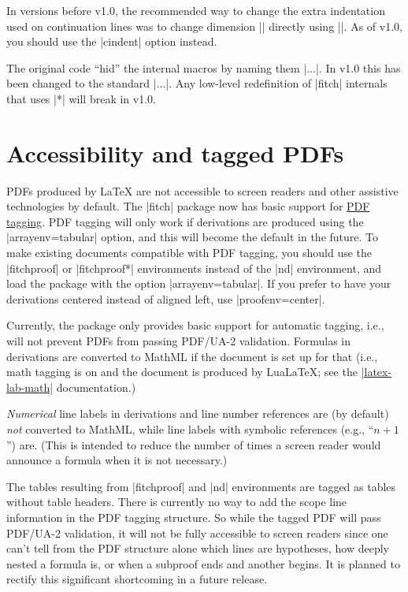 \documentclass{ltxdoc}
\newcommand\NewIn[1]{\leavevmode
  \marginpar{\hfill\fbox{\fbox{New in #1}}\hspace*{1em}}\ignorespaces}
\begin{document}
\NewIn{1.0}\DescribeMacro{\ndindent} In versions before v1.0, the recommended way
to change the extra indentation used on continuation lines was to
change dimension |\ndindent| directly using |\setlength|. As of v1.0,
you should use the |cindent| option instead.

The original code ``hid'' the internal macros by naming
them |\nd*...|. In v1.0 this has been changed to the standard
|\nd@...|. Any low-level redefinition of |fitch| internals that uses
|*| will break in v1.0.

\section{Accessibility and tagged PDFs}\label{sec-tagging}

PDFs produced by {\LaTeX} are not accessible to screen readers and
other assistive technologies by default. The |fitch| package now has
basic support for \href{https://latex3.github.io/tagging-project/}{PDF
tagging}. PDF tagging will only work if derivations are produced using
the |arrayenv=tabular| option, and this will become the default in the
future. To make existing documents compatible with PDF tagging, you
should use the |fitchproof| or |fitchproof*| environments instead of
the |nd| environment, and load the package with the option
|arrayenv=tabular|. If you prefer to have your derivations centered
instead of aligned left, use |proofenv=center|.

Currently, the package only provides basic support for automatic
tagging, i.e., will not prevent PDFs from passing PDF/UA-2 validation.
Formulas in derivations are converted to MathML if the document is set
up for that (i.e., math tagging is on and the document is produced by
Lua\LaTeX; see the
\href{https://ctan.org/tex-archive/macros/latex/required/latex-lab/latex-lab-math.pdf}{|latex-lab-math|}
documentation.)

\emph{Numerical} line labels in derivations and line number references
are (by default) \emph{not} converted to MathML, while line labels
with symbolic references (e.g., ``$n+1$'') are. (This is intended to
reduce the number of times a screen reader would announce a formula
when it is not necessary.) 

The tables resulting from |fitchproof| and |nd| environments are
tagged as tables without table headers. There is currently no way to
add the scope line information in the PDF tagging structure. So while
the tagged PDF will pass PDF/UA-2 validation, it will not be fully
accessible to screen readers since one can't tell from the PDF
structure alone which lines are hypotheses, how deeply nested a
formula is, or when a subproof ends and another begins. It is planned
to rectify this significant shortcoming in a future release.
\end{document}

